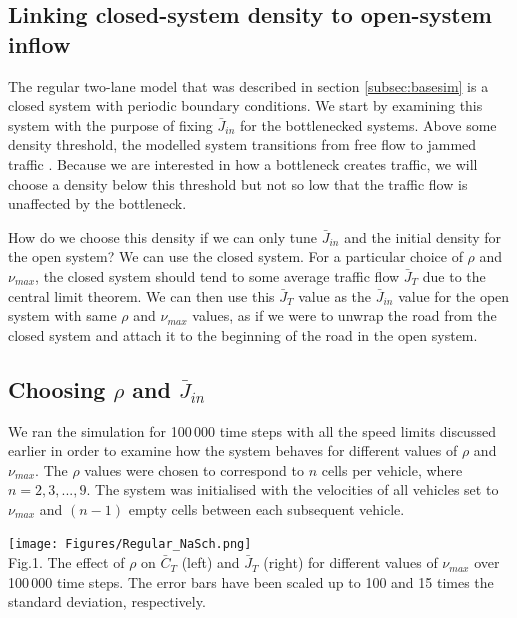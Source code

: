 \documentclass[11pt]{article}
\begin{document}
	\subsection{Linking closed-system density to open-system inflow}\label{subsec:closeopen}
	
	The regular two-lane model that was described in section \ref{subsec:basesim} is a closed system with periodic boundary conditions. We start by examining this system with the purpose of fixing $\bar{J}_{in}$ for the bottlenecked systems. Above some density threshold, the modelled system transitions from free flow to jammed traffic \cite{LubeckSchreckPhase}. Because we are interested in how a bottleneck creates traffic, we will choose a density below this threshold but not so low that the traffic flow is unaffected by the bottleneck.
	
	How do we choose this density if we can only tune $\bar{J}_{in}$ and the initial density for the open system? We can use the closed system. For a particular choice of $\rho$ and $\nu_{max}$, the closed system should tend to some average traffic flow $\bar{J}_T$ due to the central limit theorem. We can then use this $\bar{J}_T$ value as the $\bar{J}_{in}$ value for the open system with same $\rho$ and $\nu_{max}$ values, as if we were to unwrap the road from the closed system and attach it to the beginning of the road in the open system.\\
	
	\subsection{Choosing $\rho$ and $\bar{J}_{in}$}\label{subsec:regdensity}
	
	We ran the simulation for 100\,000 time steps with all the speed limits discussed earlier in order to examine how the system behaves for different values of $\rho$ and $\nu_{max}$. The $\rho$ values were chosen to correspond to $n$ cells per vehicle, where $n = 2, 3, ..., 9$. The system was initialised with the velocities of all vehicles set to $\nu_{max}$ and $(n-1)$ empty cells between each subsequent vehicle.\\
	
	\begin{center}
		\texttt{[image: Figures/Regular\_NaSch.png]}\\
		Fig.1.	
		The effect of $\rho$ on $\bar{C}_T$ (left) and $\bar{J}_T$ (right) for different values of $\nu_{max}$ over 100\,000 time steps. The error bars have been scaled up to 100 and 15 times the standard deviation, respectively.\\
	\end{center}
\end{document}
